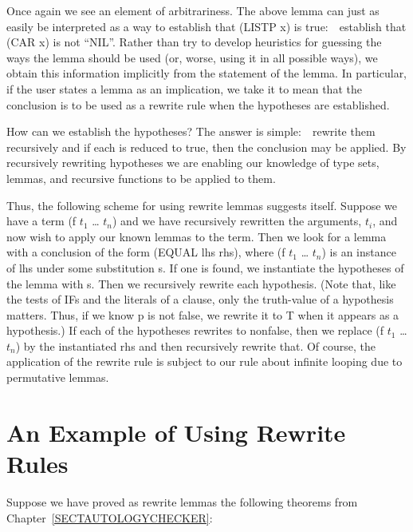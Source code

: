 \documentclass[10pt]{book}
\begin{document}
Once again we see an element of arbitrariness.
The above lemma can just as easily be interpreted as a way
to establish that (LISTP x) is true:~~establish that (CAR x) is not ``NIL''.
Rather than try to develop heuristics for guessing the ways the lemma
should be used (or, worse, using it in all possible ways), we
obtain this information implicitly from the statement
of the lemma.  In particular, if the user states a lemma as an
implication, we take it to mean that the conclusion is to be used
as a rewrite rule when the hypotheses are established.

How can we establish the hypotheses?  The answer is simple:~~rewrite them
recursively and if each is reduced to true, then the conclusion may be
applied.  By recursively rewriting hypotheses
we are enabling our knowledge of type sets, lemmas,
and recursive functions to be applied to them.

Thus, the following scheme for using rewrite lemmas suggests itself.
Suppose we have a term (f $t_{1}$ \ldots{} $t_{n}$) and we have recursively
rewritten the arguments, $t_{i}$, and now wish to apply our known
lemmas to the term.  Then we look for a lemma with a conclusion
of the form (EQUAL lhs rhs), where  (f $t_{1}$ \ldots{} $t_{n}$)   is an instance of lhs
under some substitution s.
If one is found, we instantiate the hypotheses of the lemma with s.
Then we recursively rewrite each hypothesis.  (Note that,
like the tests of IFs and the literals of a clause, only the
truth-value of a hypothesis matters.    Thus, if we know p is not false, we  rewrite it to T
when it appears as a hypothesis.)  If each of the hypotheses
rewrites to nonfalse, then we  replace (f $t_{1}$ \ldots{} $t_{n}$) by
the instantiated rhs and then recursively rewrite that.  Of course,
the application of the rewrite rule  is subject to our
rule about infinite looping due to permutative lemmas.

\section{An Example of Using Rewrite Rules}
Suppose we
have proved as rewrite lemmas the following theorems from
Chapter~\ref{SECTAUTOLOGYCHECKER}:
\end{document}
